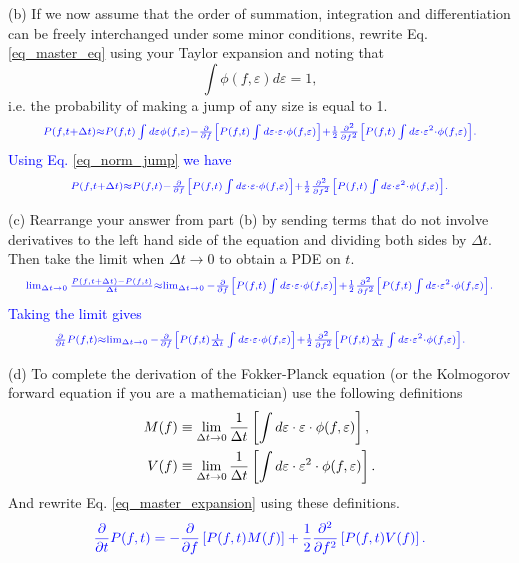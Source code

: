 \documentclass[12pt]{article}    %
\newcommand{\ee}{\varepsilon}
\newcommand{\DD}{\Delta}
\newcommand{\dd}[1]{{\partial \over \partial {#1}}}
\newcommand{\ddd}[1]{{\partial^2 \over \partial {#1} ^2}}
\begin{document}
\noindent
(b) If we now assume that the order of summation, integration and
differentiation can be freely interchanged under some minor conditions, rewrite
Eq. \ref{eq_master_eq} using your Taylor expansion and noting that
\begin{equation}\label{eq_norm_jump}
  \int \phi(f, \ee) d\ee = 1,
\end{equation}
i.e. the probability of making a jump of any size is equal to 1.
\begin{equation}
  \color{blue}\scriptstyle
  P(f, t + \DD t) \approx P(f, t) \int d\ee \phi(f, \ee) -
  \dd{f}\left[ P(f, t) \int d\ee \cdot \ee \cdot \phi(f, \ee) \right] +
  {1 \over 2} \ddd{f}
  \left[ P(f, t) \int d\ee \cdot \ee^2 \cdot \phi(f, \ee) \right].
\end{equation}
\textcolor{blue}{
Using Eq. \ref{eq_norm_jump} we have
}
\begin{equation}
  \color{blue}\scriptstyle
  P(f, t + \DD t) \approx P(f, t) -
  \dd{f}\left[ P(f, t) \int d\ee \cdot \ee \cdot \phi(f, \ee) \right] +
  {1 \over 2} \ddd{f}
  \left[ P(f, t) \int d\ee \cdot \ee^2 \cdot \phi(f, \ee) \right].
\end{equation}

\noindent
(c) Rearrange your answer from part (b) by sending terms that do not involve
derivatives to the left hand side of the equation and dividing both sides by
$\DD t$. Then take the limit when $\DD t \rightarrow 0$ to obtain a PDE on $t$.
\begin{equation}
  \color{blue}\scriptstyle
  \lim_{\DD t \rightarrow 0} {P(f, t + \DD t) - P(f, t) \over \DD t} \approx
  \lim_{\DD t \rightarrow 0} -
  \dd{f}\left[ P(f, t) \int d\ee \cdot \ee \cdot \phi(f, \ee) \right] +
  {1 \over 2} \ddd{f}
  \left[ P(f, t) \int d\ee \cdot \ee^2 \cdot \phi(f, \ee) \right].
\end{equation}
\textcolor{blue}{
Taking the limit gives
}
\begin{equation}\label{eq_master_expansion}
  \color{blue}\scriptstyle
  \dd{t}P(f, t) \approx
  \lim_{\DD t \rightarrow 0} -
  \dd{f}\left[ P(f, t) {1 \over \DD t}
  \int d\ee \cdot \ee \cdot \phi(f, \ee) \right] +
  {1 \over 2} \ddd{f}
  \left[ P(f, t) {1 \over \DD t}
  \int d\ee \cdot \ee^2 \cdot \phi(f, \ee) \right].
\end{equation}

\noindent
(d) To complete the derivation of the Fokker-Planck equation (or the Kolmogorov
forward equation if you are a mathematician) use the following definitions
\begin{align}
  M(f) &\equiv
  \lim_{\DD t \rightarrow 0} {1 \over \DD t}
  \left[ \int d\ee \cdot \ee \cdot \phi(f, \ee) \right],\\
  V(f) &\equiv
  \lim_{\DD t \rightarrow 0} {1 \over \DD t}
  \left[ \int d\ee \cdot \ee^2 \cdot \phi(f, \ee) \right].
\end{align}
And rewrite Eq. \ref{eq_master_expansion} using these definitions.
\begin{equation}
  \color{blue}
  \dd{t}P(f, t) = - \dd{f}\left[ P(f, t) M(f) \right] +
  {1 \over 2} \ddd{f}\left[ P(f, t) V(f) \right].
\end{equation}
\end{document}
